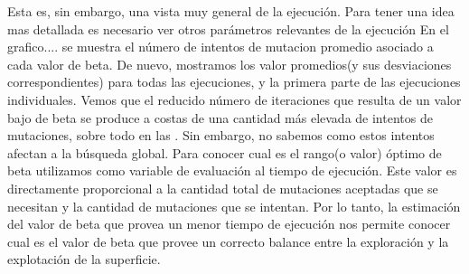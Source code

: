 Esta es, sin embargo, una vista muy general de la ejecución. 
Para tener una idea mas detallada es necesario ver otros parámetros relevantes de la ejecución
En el grafico....%
se muestra el número de intentos de mutacion promedio asociado a cada valor de beta.
De nuevo, mostramos los valor promedios(y sus desviaciones correspondientes) para todas las ejecuciones, y la primera parte de las ejecuciones individuales.
Vemos que el reducido número de iteraciones que resulta de un valor bajo de beta se produce a costas de una cantidad más elevada de intentos de mutaciones, sobre todo en las .
Sin embargo, no sabemos como estos intentos afectan a la búsqueda global.
Para conocer cual es el rango(o valor) óptimo de beta utilizamos como variable de evaluación al tiempo de ejecución. 
Este valor es directamente proporcional a la cantidad total de mutaciones aceptadas que se necesitan y la cantidad de mutaciones que se intentan.
Por lo tanto, la estimación del valor de beta que provea un menor tiempo de ejecución nos permite conocer cual es el valor de beta que provee un correcto balance entre la exploración y la explotación de la superficie.


